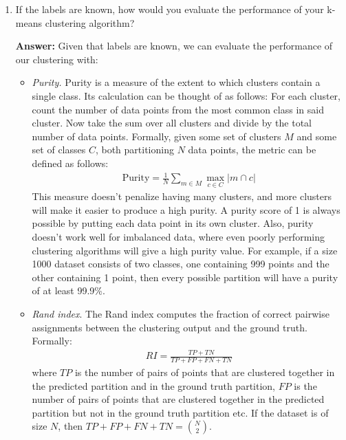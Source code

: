 \documentclass{article}
\newenvironment{QandA}{\begin{enumerate}[label=\arabic*.]}{\end{enumerate}}
\newenvironment{InnerQandA}{\begin{enumerate}[label=\roman*.]}{\end{enumerate}}
\newenvironment{answer}{\par\normalfont \textbf{Answer:}}{}
\begin{document}
\begin{QandA}
\begin{InnerQandA}
        \item If the labels are known, how would you evaluate the performance of your k-means clustering algorithm?
        \begin{answer}
            Given that labels are known, we can evaluate the performance of our clustering with:
            \begin{itemize}
                \item \textit{Purity.} Purity is a measure of the extent to which clusters contain a single class. Its calculation can be thought of as follows: For each cluster, count the number of data points from the most common class in said cluster. Now take the sum over all clusters and divide by the total number of data points. Formally, given some set of clusters $M$ and some set of classes $C$, both partitioning $N$ data points, the metric can be defined as follows:
                \begin{align*}
                    \text{Purity} = \frac{1}{N} \sum_{m \in M} \max_{c \in C} \vert m \cap c \vert
                \end{align*}
                This measure doesn't penalize having many clusters, and more clusters will make it easier to produce a high purity. A purity score of 1 is always possible by putting each data point in its own cluster. Also, purity doesn't work well for imbalanced data, where even poorly performing clustering algorithms will give a high purity value. For example, if a size 1000 dataset consists of two classes, one containing 999 points and the other containing 1 point, then every possible partition will have a purity of at least 99.9\%.
                \item \textit{Rand index}. The Rand index  computes the fraction of correct pairwise assignments between the clustering output and the ground truth. Formally:
                \begin{align*}
                    RI = \frac{TP + TN}{TP + FP + FN + TN}
                \end{align*}
                where $TP$ is the number of pairs of points that are clustered together in the predicted partition and in the ground truth partition, $FP$ is the number of pairs of points that are clustered together in the predicted partition but not in the ground truth partition etc. If the dataset is of size $N$, then $TP + FP + FN + TN = {N \choose 2}$.
            \end{itemize}
        \end{answer}


\end{InnerQandA}
\end{QandA}
\end{document}
